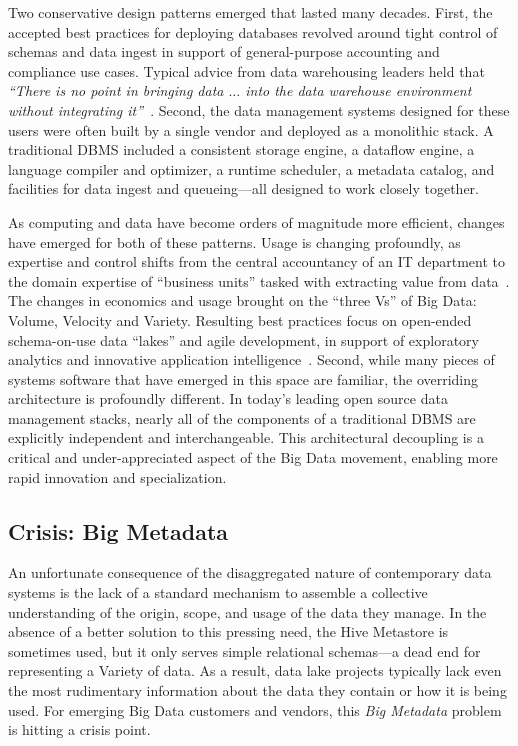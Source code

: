 \documentclass{cidr-2017}
\begin{document}
Two conservative design patterns emerged that lasted many decades. First, the accepted best practices
for deploying databases revolved around tight control of schemas and data ingest in support of 
general-purpose accounting and compliance use cases. 
Typical advice from data
warehousing leaders held that 
\emph{``There is no point in 
bringing data $\ldots$ into the data warehouse environment without integrating it''}~\cite{inmon2005building}. 
Second, 
the data management systems designed for these users were often built by a single vendor and deployed as a
monolithic stack. 
A traditional DBMS included a consistent storage engine, a dataflow engine, 
a language compiler and optimizer, a runtime scheduler, a metadata catalog, and facilities for data ingest 
and queueing---all designed to work closely together.


As computing and data have become orders of magnitude more efficient, changes have emerged for both of these patterns. 
Usage is changing profoundly, as expertise and control shifts from the central accountancy of an IT department to 
the domain expertise of ``business units'' tasked with extracting value from data~\cite{gartner}. 
The changes in economics and usage brought on the ``three Vs'' of Big Data: Volume, Velocity and Variety.
Resulting best practices focus on open-ended schema-on-use
data ``lakes'' and agile development, in support of exploratory analytics and innovative application intelligence~\cite{patil2012data}. 
Second, while many pieces of systems software that have emerged in this space are familiar, the overriding architecture is profoundly 
different. In today's leading open source
data management stacks, nearly all of the components 
of a traditional DBMS are explicitly independent 
and interchangeable.  This architectural decoupling is 
a critical and under-appreciated aspect of the Big Data movement,
enabling more rapid innovation and specialization.

\subsection{Crisis: Big Metadata}

An unfortunate consequence of the disaggregated nature of contemporary data systems
is the lack of a standard mechanism
to assemble a collective understanding of the origin, scope, and usage of the data they manage.
In the absence of a better solution to this pressing need, the 
Hive Metastore is sometimes used, but it only serves simple relational schemas---a dead end for representing a Variety of data. 
As a result, data lake projects typically lack 
even the most rudimentary information about the data they contain or how it is being used. 
For emerging Big Data customers and vendors, this \emph{Big Metadata} problem is hitting a crisis point.  
\end{document}
